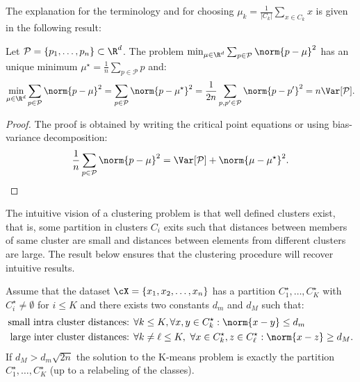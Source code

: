The explanation for the terminology and for choosing $\mu_k = \frac{1}{|C_k|}
\sum_{x \in C_k} x$ is given in the following result:

\begin{lemma}
Let $\mathcal{P} = \{p_1, \ldots, p_n\} \subset \R^d$. The problem
$\min_{\mu \in \R^d} \sum_{p \in \mathcal{P}} \norm{p - \mu}^2$ has an unique
minimum $\mu^\star = \frac{1}{n} \sum_{p \in \mathcal{P}} p$ and:
\begin{equation}\label{eq:ch8-centroid}
\min_{\mu \in \R^d} \sum_{p \in \mathcal{P}} \norm{p - \mu}^2
= \sum_{p \in \mathcal{P}} \norm{p - \mu^\star}^2
= \frac{1}{2n} \sum_{p, p' \in \mathcal{P}} \norm{p - p'}^2
= n \Var[\mathcal{P}].
\end{equation}
\end{lemma}

\begin{proof}
The proof is obtained by writing the critical point equations or using
bias-variance decomposition:
\begin{equation}\label{eq:ch8-bias-var}
\frac{1}{n} \sum_{p \in \mathcal{P}} \norm{p - \mu}^2
= \Var[\mathcal{P}] + \norm{\mu - \mu^\star}^2.
\end{equation}
\end{proof}

The intuitive vision of a clustering problem is that well defined clusters
exist, that is, some partition in clusters $C_i$ exits such that distances
between members of same cluster are small and distances between elements from
different clusters are large. The result below ensures that the clustering
procedure will recover intuitive results.

\begin{lemma}
Assume that the dataset $\cX = \{x_1, x_2, \ldots, x_n\}$ has a partition
$C_1^\star, \ldots, C_K^\star$ with $C_i^\star \neq \emptyset$ for $i \le K$
and there exists two constants $d_m$ and $d_M$ such that:
\begin{align}
\text{small intra cluster distances: } & \forall k \le K, \forall x, y \in C_k^\star :
\norm{x - y} \le d_m \label{eq:ch8-intra} \\
\text{large inter cluster distances: } & \forall k \neq \ell \le K,\ \forall x \in C_k^\star, z \in C_\ell^\star :
\norm{x - z} \ge d_M. \label{eq:ch8-inter}
\end{align}
If $d_M > d_m \sqrt{2n}$ the solution to the K-means problem is exactly the
partition $C_1^\star, \ldots, C_K^\star$ (up to a relabeling of the classes).
\end{lemma}

